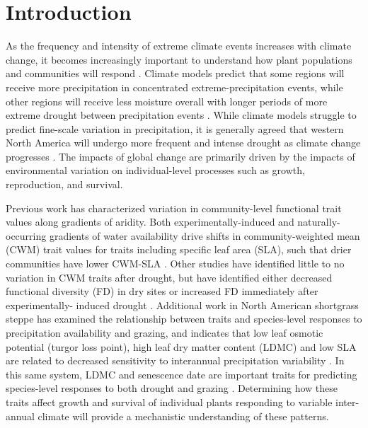 \documentclass[12pt, letterpaper]{article}
\begin{document}
\section{Introduction}
As the frequency and intensity of extreme climate events increases with climate change, it becomes increasingly important to understand how plant populations and communities will respond \citep{Vicente-Serrano2020AWarming}. Climate models predict that some regions will receive more precipitation in concentrated extreme-precipitation events, while other regions will receive less moisture overall with longer periods of more extreme drought between precipitation events \citep{Knapp2008ConsequencesEcosystems}. While climate models struggle to predict fine-scale variation in precipitation, it is generally agreed that western North America will undergo more frequent and intense drought as climate change progresses \citep{Hartmann2013}. The impacts of global change are primarily driven by the impacts of environmental variation on individual-level processes such as growth, reproduction, and survival.  

Previous work has characterized variation in community-level functional trait values along gradients of aridity. Both experimentally-induced and naturally-occurring gradients of water availability drive shifts in community-weighted mean (CWM) trait values for traits including specific leaf area (SLA), such that drier communities have lower CWM-SLA \citep{Nunes2017WhichDrylands,Cornwell2009CommunityCalifornia}. Other studies have identified little to no variation in CWM traits after drought, but have identified either decreased functional diversity (FD) in dry sites \citep{Luo2019LongGrasslands} or increased FD immediately after experimentally- induced drought \citep{Griffin-Nolan2019}. Additional work in North American shortgrass steppe has examined the relationship between traits and species-level responses to precipitation availability and grazing, and indicates that low leaf osmotic potential (turgor loss point), high leaf dry matter content (LDMC) and low SLA are related to decreased sensitivity to interannual precipitation variability \citep{Wilcox2020PlantPrairie}. In this same system, LDMC and senescence date are important traits for predicting species-level responses to both drought and grazing \citep{Blumenthal2020}. Determining how these traits affect growth and survival of individual plants responding to variable inter-annual climate will provide a mechanistic understanding of these patterns.
\end{document}
